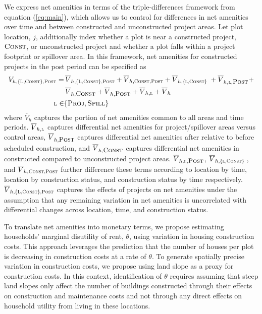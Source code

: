 \documentclass[12pt]{article}
\begin{document}
We express net amenities in terms of the triple-differences framework from equation (\ref{eq:main}), which allows us to control for differences in net amenities over time and between constructed and unconstructed project areas.  Let plot location, $j$, additionally index whether a plot is near a constructed project, $\textsc{Const}$, or unconstructed project and whether a plot falls within a project footprint or spillover area.  In this framework, net amenities for constructed projects in the post period can be specified as 
\begin{align}
\label{eq:netamenities}
\begin{split}
V_{h,\textsc{\{L,Const\},Post}} =& \, \overline{V}_{h,\textsc{\{L,Const\},Post}} + \overline{V}_{h,\textsc{Const,Post}} + \overline{V}_{h,\textsc{\{l,Const\} }}  + \overline{V}_{h,\textsc{l},\textsc{\small Post}} + \\
&\, \overline{V}_{h,\textsc{\small Const}}+ \overline{V}_{h,\textsc{\small Post}} + \overline{V}_{h,\textsc{l}}  + \overline{V}_h \\
\textsc{l} \in& \{\textsc{Proj},\textsc{Spill}\}
\end{split}
\end{align}
\noindent where $\overline{V}_h$ captures the portion of net amenities common to all areas and time periods.   $\overline{V}_{h,\textsc{l}} $  captures differential net amenities for project/spillover areas versus control areas, $\overline{V}_{h,\textsc{\small Post}} $ captures differential net amenities after relative to before scheduled construction, and $\overline{V}_{h,\textsc{\small Const}}$ captures differential net amenities in constructed compared to unconstructed project areas.  $\overline{V}_{h,\textsc{l},\textsc{\small Post}}$, $\overline{V}_{h,\textsc{\{l,Const\} }}$, and $\overline{V}_{h,\textsc{Const,Post}} $ further difference these terms according to location by time, location by construction status, and construction status by time respectively.  $\overline{V}_{h,\textsc{\{L,Const\},Post}}$ captures the effects of projects on net amenities under the assumption that any remaining variation in net amenities is uncorrelated with differential changes across location, time, and construction status. 

To translate net amenities into monetary terms, we propose estimating households' marginal disutility of rent, $\theta$, using variation in housing construction costs.  This approach leverages the prediction that the number of houses per plot is decreasing in construction costs at a rate of $\theta$.  To generate spatially precise variation in construction costs, we propose using land slope as a proxy for construction costs.  In this context, identification of $\theta$ requires assuming that steep land slopes only affect the number of buildings constructed through their effects on construction and maintenance costs and not through any direct effects on household utility from living in these locations.    
\end{document}
